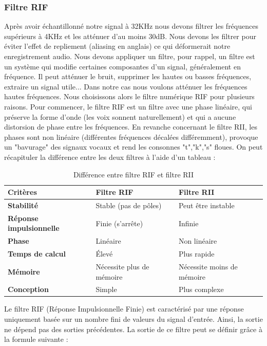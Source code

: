 \documentclass[a4paper,11pt]{article}
\begin{document}
\subsubsection{Filtre RIF} \label{rif}

Après avoir échantillonné notre signal à 32KHz nous devons filtrer les fréquences supérieurs à 4KHz et les atténuer d'au moins 30dB. Nous devons les filtrer pour éviter l'effet de repliement (aliasing en anglais) ce qui déformerait notre enregistrement audio. Nous devons appliquer un filtre, pour rappel, un filtre est un système qui modifie certaines composantes d’un signal, généralement en fréquence. Il peut atténuer le bruit, supprimer les hautes ou basses fréquences, extraire un signal utile... Dans notre cas nous voulons atténuer les fréquences hautes fréquences. Nous choisissons alors le filtre numérique RIF pour plusieurs raisons. Pour commencer, le filtre RIF est un filtre avec une phase linéaire, qui préserve la forme d'onde (les voix sonnent naturellement) et qui a aucune distorsion de phase entre les fréquences. En revanche concernant le filtre RII, les phases sont non linéaire (différentes fréquences décalées différemment), provoque un "bavurage" des signaux vocaux et rend les consonnes "t","k","s" floues. On peut récapituler la différence entre les deux filtres à l'aide d'un tableau : 

\begin{table} [h]
\centering
\begin{tabular}{l l l}
\hline
\textbf{Critères} & \textbf{Filtre RIF} & \textbf{Filtre RII} \\
\hline
\textbf{Stabilité} & Stable (pas de pôles) & Peut être instable \\
\textbf{Réponse impulsionnelle} & Finie (s'arrête) & Infinie \\
\textbf{Phase} & Linéaire & Non linéaire \\
\textbf{Temps de calcul} & Élevé & Plus rapide \\
\textbf{Mémoire} & Nécessite plus de mémoire & Nécessite moins de mémoire \\
\textbf{Conception} & Simple & Plus complexe \\
\hline
\end{tabular}
\caption{Différence entre filtre RIF et filtre RII}
\end{table}
Le filtre RIF \cite{filtre} (Réponse Impulsionnelle Finie) est caractérisé par une réponse uniquement basée sur un nombre fini de valeurs du signal d'entrée. Ainsi, la sortie ne dépend pas des sorties précédentes. La sortie de ce filtre peut se définir grâce à la formule suivante : 
\end{document}

